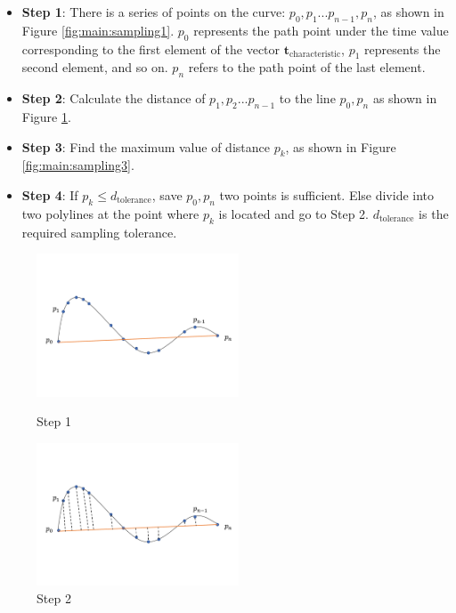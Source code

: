 \begin{itemize}
 \item \textbf{Step 1}: There is a series of points on the curve: $p_{0},p_{1}...p_{n-1},p_{n}$, as shown in
Figure \ref{fig:main:sampling1}. $p_{0}$ represents the path point under the time value corresponding to the first element of the vector $\boldsymbol{t_{\mathrm{characteristic}}}$, $p_{1}$ represents the second element, and so on. $p_{n}$ refers to the path point of the last element.
\item \textbf{Step 2}: Calculate the distance of $p_{1},p_{2}...p_{n-1}$ to the line $p_{0},p_{n}$ as shown in Figure \ref{fig:main:sampling2}.
\item \textbf{Step 3}: Find the maximum value of distance $p_{k}$, as shown in
Figure \ref{fig:main:sampling3}.
\item \textbf{Step 4}: If $p_{k}\leq d_\mathrm{tolerance}$, save $p_{0},p_{n}$ two points is sufficient. Else divide into two polylines at the point where $p_{k}$ is located and go to Step 2. $d_\mathrm{tolerance}$ is the required sampling tolerance.
\end{itemize}
\begin{figure}[h!]
\centering
\vspace{-1cm}
\setlength{\abovecaptionskip}{-1cm} 
\begin{minipage}[t]{0.48\textwidth}
\centering
\includegraphics[width=6cm]{03_images/sampling_1.pdf}
\caption{Step 1}
\label{fig:main:sampling1}
\end{minipage}
\begin{minipage}[t]{0.48\textwidth}
\centering
\includegraphics[width=6cm]{03_images/sampling_2.pdf}
\caption{Step 2}
\label{fig:main:sampling2}
\end{minipage}
\end{figure}
